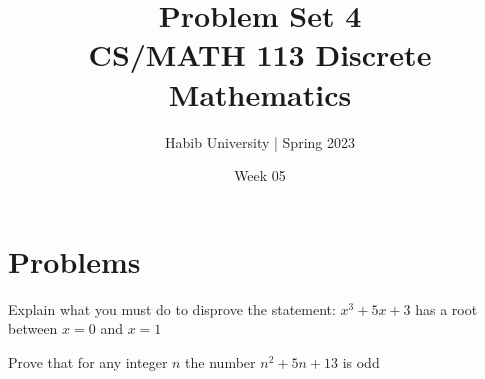 \documentclass{article}
\newenvironment{problem}[2][Problem]{\begin{trivlist}
\item[\hskip \labelsep {\bfseries #1}\hskip \labelsep {\bfseries #2.}]}{\end{trivlist}}
\begin{document}
\title{Problem Set 4\\CS/MATH 113 Discrete Mathematics}
\author{Habib University | Spring 2023}
\date{Week 05}
\maketitle

\section{Problems}

\begin{problem}{1}
Explain what you must do to disprove the statement:
$x^3+5x + 3$ has a root between $x = 0$ and $x=1$
\end{problem}

\begin{problem}{2}
Prove that for any integer $n$ the number $n^2+5n+13$ is odd
\end{problem}
\end{document}

